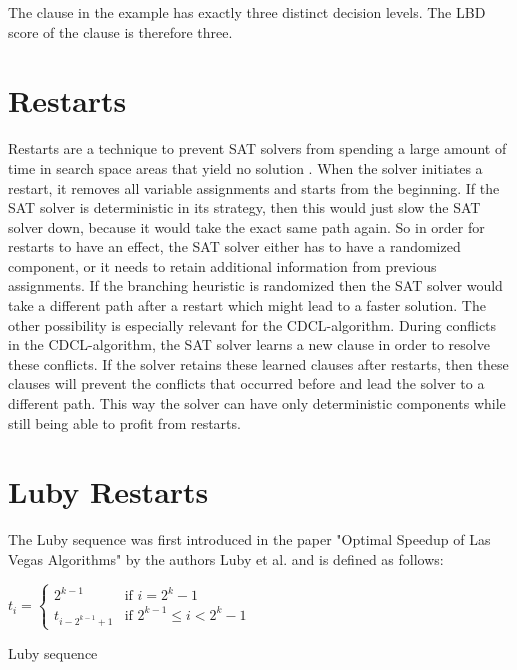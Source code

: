 The clause in the example has exactly three distinct decision levels. The LBD score of the clause is therefore three.

\section{Restarts}

Restarts are a technique to prevent SAT solvers from spending a large amount of time in search space areas that yield no solution \cite{biere2009handbook}. When the solver initiates a restart, it removes all variable assignments and starts from the beginning. If the SAT solver is deterministic in its strategy, then this would just slow the SAT solver down, because it would take the exact same path again. So in order for restarts to have an effect, the SAT solver either has to have a randomized component, or it needs to retain additional information from previous assignments. If the branching heuristic is randomized then the SAT solver would take a different path after a restart which might lead to a faster solution. The other possibility is especially relevant for the CDCL-algorithm. During conflicts in the CDCL-algorithm, the SAT solver learns a new clause in order to resolve these conflicts. If the solver retains these learned clauses after restarts, then these clauses will prevent the conflicts that occurred before and lead the solver to a different path. This way the solver can have only deterministic components while still being able to profit from restarts. \cite{biere2009handbook}

\section{Luby Restarts}

The Luby sequence was first introduced in the paper "Optimal Speedup of Las Vegas Algorithms" \cite{luby1993optimal} by the authors Luby et al. and is defined as follows:

\begin{definition}
\centering
\begin{leftbar}
$t_i =
\begin{cases}
  2^{k-1} & \text{if } i = 2^k - 1   \\
  t_{i-2^{k-1}+1} & \text{if } 2^{k-1} \leq i < 2^k - 1
\end{cases}$
\end{leftbar}
\caption{Luby sequence \cite{luby1993optimal}}
\end{definition}

